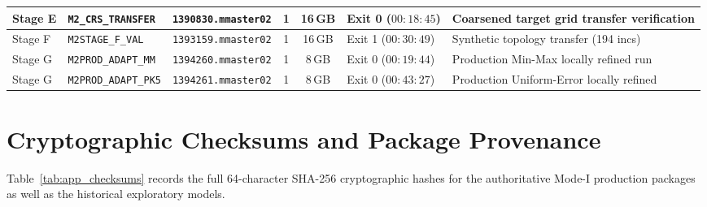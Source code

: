 \begin{table}[htbp]
\begin{tabularx}{\textwidth}{lllcclX}
Stage E & \texttt{M2\_CRS\_TRANSFER} & \texttt{1390830.mmaster02} & 1 & 16\,GB & Exit 0 ($00{:}18{:}45$) & Coarsened target grid transfer verification \\
\midrule
Stage F & \texttt{M2STAGE\_F\_VAL} & \texttt{1393159.mmaster02} & 1 & 16\,GB & Exit 1 ($00{:}30{:}49$) & Synthetic topology transfer (194 incs) \\
\midrule
Stage G & \texttt{M2PROD\_ADAPT\_MM} & \texttt{1394260.mmaster02} & 1 & 8\,GB & Exit 0 ($00{:}19{:}44$) & Production Min-Max locally refined run \\
Stage G & \texttt{M2PROD\_ADAPT\_PK5} & \texttt{1394261.mmaster02} & 1 & 8\,GB & Exit 0 ($00{:}43{:}27$) & Production Uniform-Error locally refined \\
\bottomrule
\end{tabularx}
\end{table}

\section{Cryptographic Checksums and Package Provenance}
\label{sec:app_checksums}

Table~\ref{tab:app_checksums} records the full 64-character SHA-256 cryptographic hashes for the authoritative Mode-I production packages as well as the historical exploratory models.

